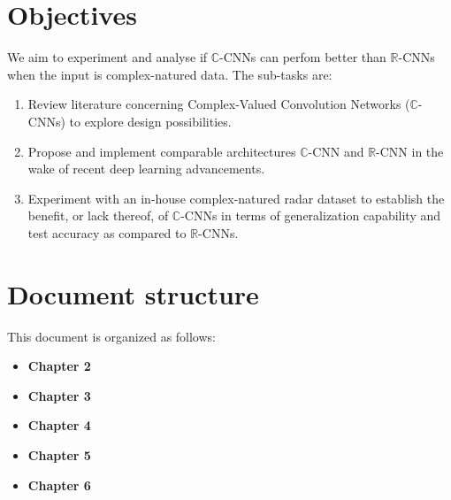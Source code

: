 
%

\section{Objectives} \label{sect:thefirst}
We aim to experiment and analyse if $\mathbb{C}$-CNNs can perfom better than $\mathbb{R}$-CNNs when the input is complex-natured data. The sub-tasks are:

\begin{enumerate}
	\item Review literature concerning Complex-Valued Convolution Networks ($\mathbb{C}$-CNNs) to explore design possibilities.
	\item Propose and implement comparable architectures $\mathbb{C}$-CNN and $\mathbb{R}$-CNN in the wake of recent deep learning advancements.
	\item Experiment with an in-house complex-natured radar dataset to establish the benefit, or lack thereof, of $\mathbb{C}$-CNNs in terms of generalization capability and test accuracy as compared to $\mathbb{R}$-CNNs.
\end{enumerate}


\section{Document structure} \label{sect:thefirst}

This document is organized as follows:
\begin{itemize}
	\item \textbf{Chapter 2}
	\item \textbf{Chapter 3}
	\item \textbf{Chapter 4}
	\item \textbf{Chapter 5}
	\item \textbf{Chapter 6}	
	
\end{itemize}


